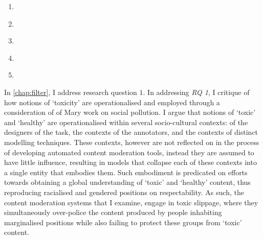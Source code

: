 \begin{center}
\begin{minipage}{0.9\textwidth}
\begin{enumerate}[start=1, label={\textbf{RQ \arabic*}}]
        \item{\textit{}}
        \item{\textit{}}
        \item{\textit{}}
        \item{\textit{}}
        \item{\textit{}}
    \end{enumerate}
    \vspace{5mm}
\end{minipage}
\end{center}

In \cref{chap:filter}, I address research question $1$.
In addressing \textit{RQ 1}, I critique of how notions of `toxicity' are operationalised and employed through a consideration of of Mary \citet{Douglas:1966} work on social pollution.
I argue that notions of `toxic' and `healthy' are operationalised within several socio-cultural contexts:  of the designers of the task, the contexts of the annotators, and the contexts of distinct modelling techniques.
These contexts, however are not reflected on in the process of developing automated content moderation tools, instead they are assumed to have little influence, resulting in models that collapse each of these contexts into a single entity that embodies them.
Such embodiment is predicated on efforts towards obtaining a global understanding of `toxic' and `healthy' content, thus reproducing racialised and gendered positions on respectability.
As such, the content moderation systems that I examine, engage in toxic slippage, where they simultaneously over-police the content produced by people inhabiting marginalised positions while also failing to protect these groups from `toxic' content.


